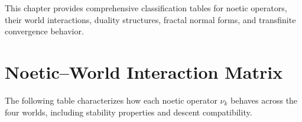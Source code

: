 \begin{tcolorbox}[colback=blue!5!white,colframe=blue!75!black,title=\vnewfour,breakable]
This chapter provides comprehensive classification tables for noetic operators,
their world interactions, duality structures, fractal normal forms, and
transfinite convergence behavior.
\end{tcolorbox}

\section{Noetic--World Interaction Matrix}

The following table characterizes how each noetic operator $\nu_k$ behaves
across the four worlds, including stability properties and descent compatibility.

\renewcommand{\arraystretch}{1.32}
\small
